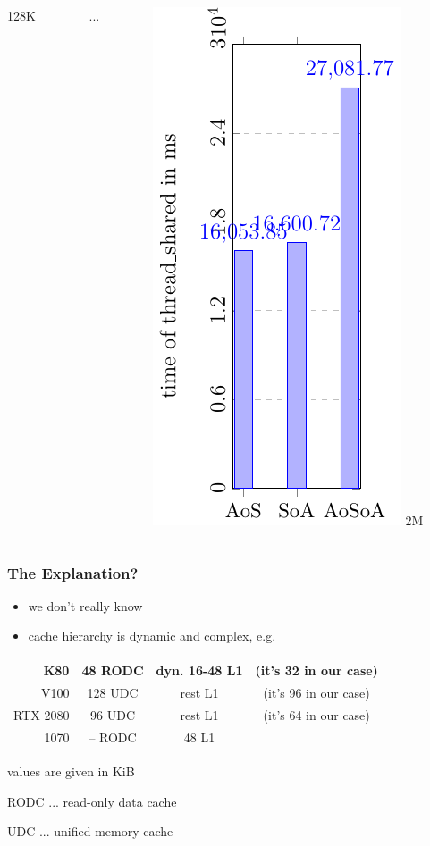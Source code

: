 \documentclass[aspectratio=169]{beamer}
\begin{document}
\begin{frame}
\begin{columns}
\begin{column}{0.25\textwidth}
	\small 128K
	\end{column}
	\begin{column}{0.25\textwidth}
	\large ...
	\end{column}	
	\begin{column}{0.25\textwidth}
	\includegraphics[scale=0.55]{figures/fig50.pdf}
	\small 2M
	\end{column}	
	\end{columns}
	
\end{frame}

\begin{frame}
	\frametitle{The Explanation?}
	\begin{itemize}
		\item we don't really know
		\item cache hierarchy is dynamic and complex, e.g.
	\end{itemize}
	\bigskip
	
		\begin{tabular}{ |r|| c | c c| }
			\hline
			K80 & 48 RODC & dyn. 16-48 L1 & (it's 32 in our case)\\
			\hline
			V100 & 128 UDC & rest L1 & (it's 96 in our case)\\
			\hline
			RTX 2080 & 96 UDC & rest L1 & (it's 64 in our case)\\
			\hline
			1070 & -- RODC & 48 L1 &\\
			\hline
		\end{tabular}
		
	\small *values are given in KiB
	\smallskip
	
	\small RODC ... read-only data cache
	
	\small UDC ... unified memory cache
\end{frame}
\end{document}

